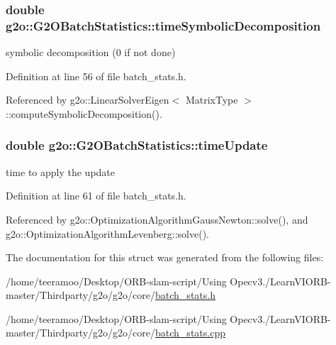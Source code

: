 \subsubsection[{\texorpdfstring{time\+Symbolic\+Decomposition}{timeSymbolicDecomposition}}]{\setlength{\rightskip}{0pt plus 5cm}double g2o\+::\+G2\+O\+Batch\+Statistics\+::time\+Symbolic\+Decomposition}\hypertarget{structg2o_1_1G2OBatchStatistics_a456a521ccb1e4c69940475a92a1f5d29}{}\label{structg2o_1_1G2OBatchStatistics_a456a521ccb1e4c69940475a92a1f5d29}


symbolic decomposition (0 if not done) 



Definition at line 56 of file batch\+\_\+stats.\+h.



Referenced by g2o\+::\+Linear\+Solver\+Eigen$<$ Matrix\+Type $>$\+::compute\+Symbolic\+Decomposition().

\subsubsection[{\texorpdfstring{time\+Update}{timeUpdate}}]{\setlength{\rightskip}{0pt plus 5cm}double g2o\+::\+G2\+O\+Batch\+Statistics\+::time\+Update}\hypertarget{structg2o_1_1G2OBatchStatistics_a510e287e5a3e1f608219147b53e6dc69}{}\label{structg2o_1_1G2OBatchStatistics_a510e287e5a3e1f608219147b53e6dc69}


time to apply the update 



Definition at line 61 of file batch\+\_\+stats.\+h.



Referenced by g2o\+::\+Optimization\+Algorithm\+Gauss\+Newton\+::solve(), and g2o\+::\+Optimization\+Algorithm\+Levenberg\+::solve().



The documentation for this struct was generated from the following files\+:\begin{DoxyCompactItemize}
\item 
/home/teeramoo/\+Desktop/\+O\+R\+B-\/slam-\/script/\+Using Opecv3./\+Learn\+V\+I\+O\+R\+B-\/master/\+Thirdparty/g2o/g2o/core/\hyperlink{batch__stats_8h}{batch\+\_\+stats.\+h}\item 
/home/teeramoo/\+Desktop/\+O\+R\+B-\/slam-\/script/\+Using Opecv3./\+Learn\+V\+I\+O\+R\+B-\/master/\+Thirdparty/g2o/g2o/core/\hyperlink{batch__stats_8cpp}{batch\+\_\+stats.\+cpp}\end{DoxyCompactItemize}
